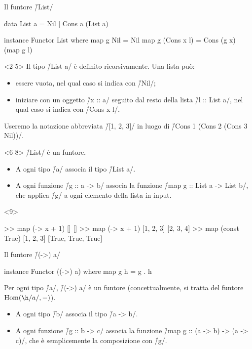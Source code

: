 \begin{frame}[fragile]{\secname}{Il funtore \h/List/}
\begin{overlayarea}{\textwidth}{0.7\textheight}
\begin{haskellcode}
data List a = Nil | Cons a (List a)

instance Functor List where
    map g Nil = Nil
    map g (Cons x l) = Cons (g x) (map g l)
\end{haskellcode}

\begin{onlyenv}<2-5>
Il tipo \h/List a/ è definito ricorsivamente. Una lista può:
\pause
\begin{itemize}[<+(1)->]
\item essere vuota, nel qual caso si indica con \h/Nil/;
\item iniziare con un oggetto \h/x :: a/ seguito dal resto della lista \h/l :: List a/, nel qual caso si indica con \h/Cons x l/.
\end{itemize}
\pause
Useremo la notazione abbreviata \h/[1, 2, 3]/ in luogo di
\h/Cons 1 (Cons 2 (Cons 3 Nil))/.
\end{onlyenv}

\begin{onlyenv}<6-8>
\h/List/ è un funtore.
\pause
\begin{itemize}[<+(1)->]
\item A ogni tipo \h/a/ associa il tipo \h/List a/.
\item A ogni funzione \h/g :: a -> b/ associa la funzione \h/map g :: List a -> List b/, che applica \h/g/ a ogni elemento della lista in input.
\end{itemize}
\end{onlyenv}

\begin{onlyenv}<9>
\begin{runhaskell}
>>  map (\x -> x + 1) []
    []
>>  map (\x -> x + 1) [1, 2, 3]
    [2, 3, 4]
>>  map (const True) [1, 2, 3]
    [True, True, True]
\end{runhaskell}
\end{onlyenv}
\end{overlayarea}
\end{frame}

\begin{frame}[fragile]{\secname}{Il funtore \h/(->) a/}
\begin{haskellcode}
instance Functor ((->) a) where
    map g h = g . h
\end{haskellcode}
\pause

Per ogni tipo \h/a/, \h/(->) a/ è un funtore (concettualmente, si tratta del funtore $\Hom(\h/a/,-)$).
\begin{itemize}[<+(1)->]
\item A ogni tipo \h/b/ associa il tipo \h/a -> b/.
\item A ogni funzione \h/g :: b -> c/ associa la funzione \h/map g :: (a -> b) -> (a -> c)/, che è semplicemente la composizione con \h/g/.
\end{itemize}
\end{frame}

